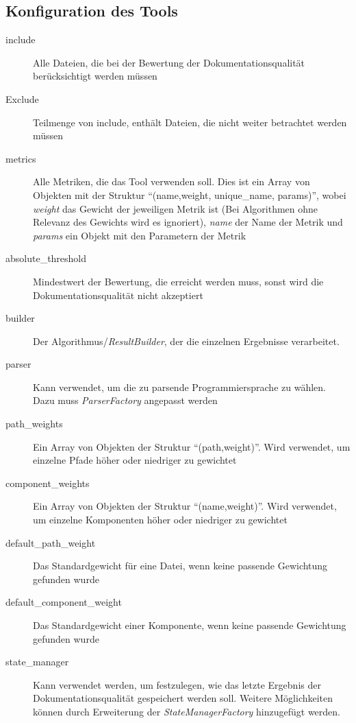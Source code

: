 \begin{appendices}
\chapter{Konfiguration des Tools}
\begin{description}
        \item[include]  Alle Dateien, die bei der Bewertung der Dokumentationsqualität berücksichtigt werden müssen
        \item[Exclude]  Teilmenge von include, enthält Dateien, die nicht weiter betrachtet werden müssen
        \item[metrics]  Alle Metriken, die das Tool verwenden soll. Dies ist ein Array von Objekten mit der Struktur \enquote{(name,weight, unique\_name, params)}, wobei \textit{weight} das Gewicht der jeweiligen Metrik ist (Bei Algorithmen ohne Relevanz des Gewichts wird es ignoriert), \textit{name} der Name der Metrik und \textit{params} ein Objekt mit den Parametern der Metrik
        \item[absolute\_threshold] Mindestwert der Bewertung, die erreicht werden muss, sonst wird die Dokumentationsqualität nicht akzeptiert
       
          \item[builder] Der Algorithmus/\textit{ResultBuilder}, der die einzelnen Ergebnisse verarbeitet.
        
        \item[parser]  Kann verwendet, um die zu parsende Programmiersprache zu wählen. Dazu muss \textit{ParserFactory} angepasst werden
        
        \item[path\_weights] Ein Array von Objekten der Struktur \enquote{(path,weight)}. Wird verwendet, um einzelne Pfade höher oder niedriger zu gewichtet
        
         \item[component\_weights] Ein Array von Objekten der Struktur \enquote{(name,weight)}. Wird verwendet, um einzelne Komponenten höher oder niedriger zu gewichtet
         
         \item[default\_path\_weight] Das Standardgewicht für eine Datei, wenn keine passende Gewichtung gefunden wurde
         
         \item[default\_component\_weight] Das Standardgewicht einer Komponente, wenn keine passende Gewichtung gefunden wurde
         
         \item[state\_manager] Kann verwendet werden, um festzulegen, wie das letzte Ergebnis der Dokumentationsqualität gespeichert werden soll. Weitere Möglichkeiten können durch Erweiterung der \textit{StateManagerFactory} hinzugefügt werden.
         

\end{description}
\end{appendices}
